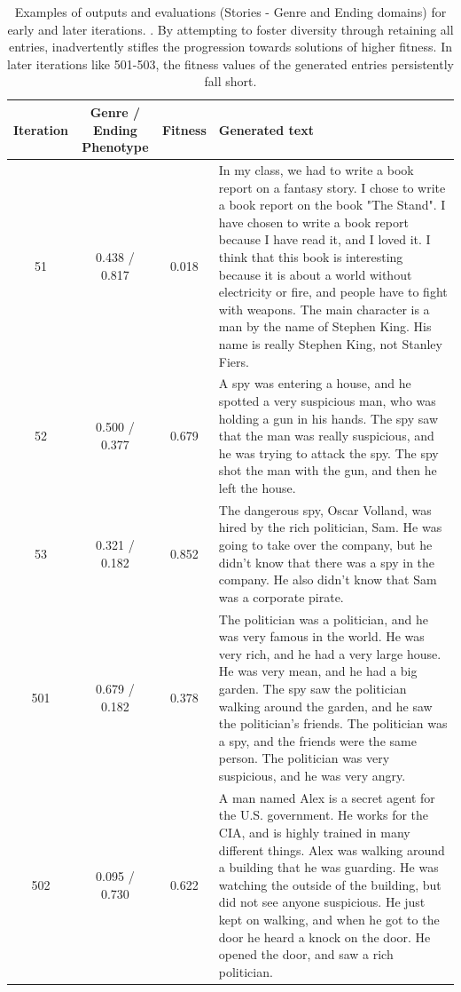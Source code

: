 \begin{table}[ht]
  \caption{Examples of outputs and evaluations (Stories - Genre and Ending domains) for early and later iterations. \basethree. By attempting to foster diversity through retaining all entries, \basethree{} inadvertently stifles the progression towards solutions of higher fitness. In later iterations like 501-503, the fitness values of the generated entries persistently fall short.}
  \label{tab:b3-qualitative-story}
  \begin{center}
  \small
  \begin{tabular}{cccp{8.5cm}}
    \toprule
    Iteration & \makecell[t]{Genre / Ending \\ Phenotype} & Fitness & Generated text \\
    \midrule
    51 &  0.438 / 0.817 & 0.018 & In my class, we had to write a book report on a fantasy story. I chose to write a book report on the book "The Stand". I have chosen to write a book report because I have read it, and I loved it. I think that this book is interesting because it is about a world without electricity or fire, and people have to fight with weapons. The main character is a man by the name of Stephen King. His name is really Stephen King, not Stanley Fiers. \\
    \midrule
    52 & 0.500 / 0.377 & 0.679 & A spy was entering a house, and he spotted a very suspicious man, who was holding a gun in his hands. The spy saw that the man was really suspicious, and he was trying to attack the spy. The spy shot the man with the gun, and then he left the house. \\
    \midrule
    53 & 0.321 / 0.182 & 0.852 & The dangerous spy, Oscar Volland, was hired by the rich politician, Sam. He was going to take over the company, but he didn't know that there was a spy in the company. He also didn't know that Sam was a corporate pirate. \\
    \midrule
    \midrule
    501 &  0.679 / 0.182 & 0.378 & The politician was a politician, and he was very famous in the world. He was very rich, and he had a very large house. He was very mean, and he had a big garden. The spy saw the politician walking around the garden, and he saw the politician's friends. The politician was a spy, and the friends were the same person. The politician was very suspicious, and he was very angry. \\
    \midrule
    502 & 0.095 / 0.730 & 0.622 & A man named Alex is a secret agent for the U.S. government. He works for the CIA, and is highly trained in many different things. Alex was walking around a building that he was guarding. He was watching the outside of the building, but did not see anyone suspicious. He just kept on walking, and when he got to the door he heard a knock on the door. He opened the door, and saw a rich politician. \\

\end{tabular}
\end{center}
\end{table}
